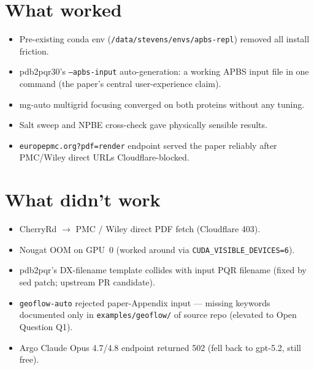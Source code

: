 \documentclass[11pt,letterpaper]{article}
\begin{document}
\section{What worked}
\begin{itemize}
\item Pre-existing conda env (\texttt{/data/stevens/envs/apbs-repl}) removed all install friction.
\item pdb2pqr30's \texttt{--apbs-input} auto-generation: a working APBS input file in one command (the paper's central user-experience claim).
\item mg-auto multigrid focusing converged on both proteins without any tuning.
\item Salt sweep and NPBE cross-check gave physically sensible results.
\item \texttt{europepmc.org?pdf=render} endpoint served the paper reliably after PMC/Wiley direct URLs Cloudflare-blocked.
\end{itemize}

\section{What didn't work}
\begin{itemize}
\item CherryRd $\rightarrow$ PMC / Wiley direct PDF fetch (Cloudflare 403).
\item Nougat OOM on GPU~0 (worked around via \texttt{CUDA\_VISIBLE\_DEVICES=6}).
\item pdb2pqr's DX-filename template collides with input PQR filename (fixed by sed patch; upstream PR candidate).
\item \texttt{geoflow-auto} rejected paper-Appendix input --- missing keywords documented only in \texttt{examples/geoflow/} of source repo (elevated to Open Question Q1).
\item Argo Claude Opus 4.7/4.8 endpoint returned 502 (fell back to gpt-5.2, still free).
\end{itemize}
\end{document}

